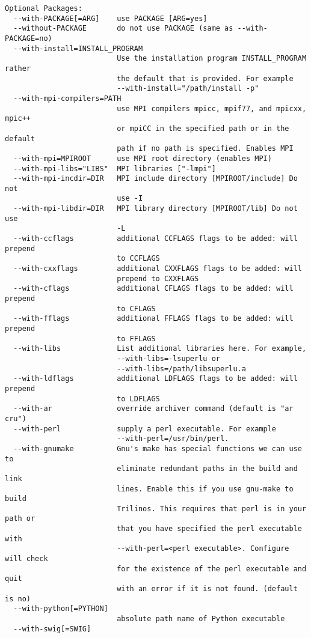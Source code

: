 \begin{verbatim}
Optional Packages:
  --with-PACKAGE[=ARG]    use PACKAGE [ARG=yes]
  --without-PACKAGE       do not use PACKAGE (same as --with-PACKAGE=no)
  --with-install=INSTALL_PROGRAM
                          Use the installation program INSTALL_PROGRAM rather
                          the default that is provided. For example
                          --with-install="/path/install -p"
  --with-mpi-compilers=PATH
                          use MPI compilers mpicc, mpif77, and mpicxx, mpic++
                          or mpiCC in the specified path or in the default
                          path if no path is specified. Enables MPI
  --with-mpi=MPIROOT      use MPI root directory (enables MPI)
  --with-mpi-libs="LIBS"  MPI libraries ["-lmpi"]
  --with-mpi-incdir=DIR   MPI include directory [MPIROOT/include] Do not
                          use -I
  --with-mpi-libdir=DIR   MPI library directory [MPIROOT/lib] Do not use
                          -L
  --with-ccflags          additional CCFLAGS flags to be added: will prepend
                          to CCFLAGS
  --with-cxxflags         additional CXXFLAGS flags to be added: will
                          prepend to CXXFLAGS
  --with-cflags           additional CFLAGS flags to be added: will prepend
                          to CFLAGS
  --with-fflags           additional FFLAGS flags to be added: will prepend
                          to FFLAGS
  --with-libs             List additional libraries here. For example,
                          --with-libs=-lsuperlu or
                          --with-libs=/path/libsuperlu.a
  --with-ldflags          additional LDFLAGS flags to be added: will prepend
                          to LDFLAGS
  --with-ar               override archiver command (default is "ar cru")
  --with-perl             supply a perl executable. For example
                          --with-perl=/usr/bin/perl.
  --with-gnumake          Gnu's make has special functions we can use to
                          eliminate redundant paths in the build and link
                          lines. Enable this if you use gnu-make to build
                          Trilinos. This requires that perl is in your path or
                          that you have specified the perl executable with
                          --with-perl=<perl executable>. Configure will check
                          for the existence of the perl executable and quit
                          with an error if it is not found. (default is no)
  --with-python[=PYTHON]
                          absolute path name of Python executable
  --with-swig[=SWIG]

\end{verbatim}
